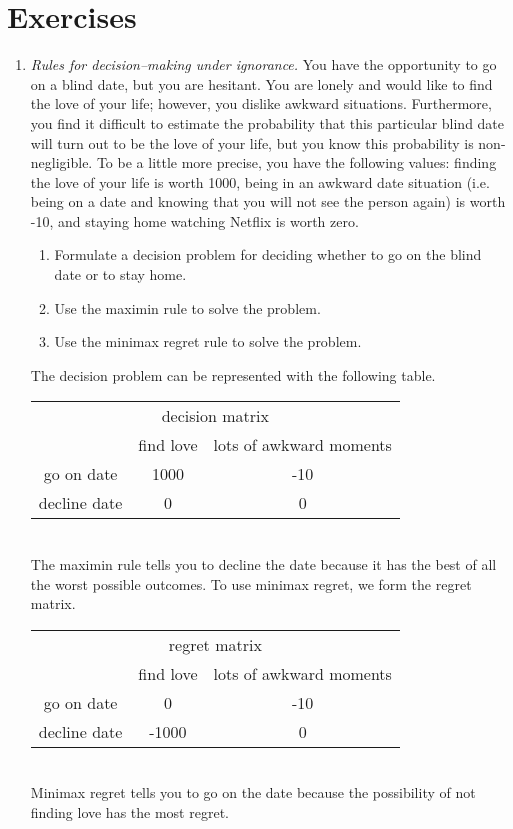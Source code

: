 \section{Exercises}
\begin{enumerate}
	
\item \emph{Rules for decision--making under ignorance.}
  You have the opportunity to go on a
  blind date, but you are hesitant.  You are lonely and would like to
  find the love of your life; however, you dislike awkward
  situations. Furthermore, you find it difficult to estimate the
  probability that this particular blind date will turn out to be the
  love of your life, but you know this probability is
  non-negligible. To be a little more precise, you have the following
  values: finding the love of your life is worth 1000, being in an
  awkward date situation (i.e. being on a date and knowing that you
  will not see the person again) is worth -10, and staying home
  watching Netflix is worth zero.

\begin{enumerate}
\item Formulate a decision problem for deciding whether to go on the
blind date or to stay home.
\item Use the maximin rule to solve the problem.
\item Use the minimax regret rule to solve the problem.
\end{enumerate}

\begin{solution}
\bs The decision problem can be represented with the following table.
\\[.1in]
\begin{tabular}{ccc}
 \multicolumn{3}{c}{decision matrix} \\
 & find love & lots of awkward moments \\ \cline{2-3}
go on date & 1000 & -10 \\
decline date & 0 & 0 
\end{tabular}
\\[.1in] 
The maximin rule tells you to decline the date because it has
the best of all the worst possible outcomes. To use minimax regret, we
form the regret matrix.  \\[.1in]
\begin{tabular}{ccc}
 \multicolumn{3}{c}{regret matrix} \\
 & find love & lots of awkward moments \\ \cline{2-3}
go on date & 0 & -10 \\
decline date & -1000 & 0
\end{tabular}
\\[.1in] Minimax regret tells you to go on the date because the
possibility of not finding love has the most regret.
\end{solution}


\end{enumerate}
